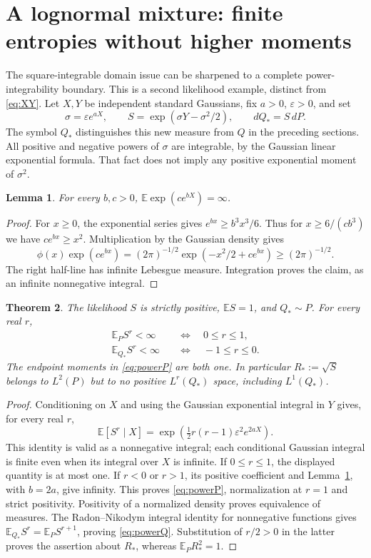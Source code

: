 \documentclass[11pt]{article}
\newtheorem{theorem}{Theorem}[section]
\newtheorem{lemma}[theorem]{Lemma}
\theoremstyle{remark}\newtheorem{remark}[theorem]{Remark}
\newcommand{\E}{\mathbb E}
\begin{document}
\section{A lognormal mixture: finite entropies without higher moments}\label{sec:lognormal}
The square-integrable domain issue can be sharpened to a complete
power-integrability boundary. This is a second likelihood example,
distinct from \eqref{eq:XY}. Let $X,Y$ be independent standard
Gaussians, fix $a>0$, $\varepsilon>0$, and set
\[
 \sigma=\varepsilon e^{aX},\qquad
 S=\exp(\sigma Y-\sigma^2/2),\qquad dQ_*=S\,dP.
\]
The symbol $Q_*$ distinguishes this new measure from $Q$ in the
preceding sections. All positive and negative powers of $\sigma$
are integrable, by the Gaussian linear exponential formula. That
fact does not imply any positive exponential moment of $\sigma^2$.

\begin{lemma}\label{lem:doubleexp}
For every $b,c>0$, $\E\exp(c e^{bX})=\infty$.
\end{lemma}
\begin{proof}
For $x\ge0$, the exponential series gives $e^{bx}\ge b^3x^3/6$.
Thus for $x\ge6/(cb^3)$ we have $ce^{bx}\ge x^2$. Multiplication by
the Gaussian density gives
\[
 \phi(x)\exp(ce^{bx})
 =(2\pi)^{-1/2}\exp(-x^2/2+ce^{bx})\ge(2\pi)^{-1/2}.
\]
The right half-line has infinite Lebesgue measure. Integration proves
the claim, as an infinite nonnegative integral.
\end{proof}

\begin{theorem}\label{thm:lognormalpowers}
The likelihood $S$ is strictly positive, $\E S=1$, and $Q_*\sim P$.
For every real $r$,
\begin{align}
 \E_P S^r<\infty&\quad\Longleftrightarrow\quad0\le r\le1,
       \label{eq:powerP}\\
 \E_{Q_*}S^r<\infty&\quad\Longleftrightarrow\quad-1\le r\le0.
       \label{eq:powerQ}
\end{align}
The endpoint moments in \eqref{eq:powerP} are both one. In
particular $R_*:=\sqrt S$ belongs to $L^2(P)$ but to no positive
$L^r(Q_*)$ space, including $L^1(Q_*)$.
\end{theorem}
\begin{proof}
Conditioning on $X$ and using the Gaussian exponential integral in
$Y$ gives, for every real $r$,
\[
 \E[S^r\mid X]=\exp\left(\tfrac12r(r-1)\varepsilon^2e^{2aX}\right).
\]
This identity is valid as a nonnegative integral; each conditional
Gaussian integral is finite even when its integral over $X$ is
infinite. If $0\le r\le1$, the displayed quantity is at most one.
If $r<0$ or $r>1$, its positive coefficient and
Lemma~\ref{lem:doubleexp}, with $b=2a$, give infinity. This proves
\eqref{eq:powerP}, normalization at $r=1$ and strict positivity.
Positivity of a normalized density proves equivalence of measures.
The Radon--Nikodym integral identity for nonnegative functions gives
$\E_{Q_*}S^r=\E_P S^{r+1}$, proving \eqref{eq:powerQ}. Substitution
of $r/2>0$ in the latter proves the assertion about $R_*$, whereas
$\E_P R_*^2=1$.
\end{proof}
\end{document}
